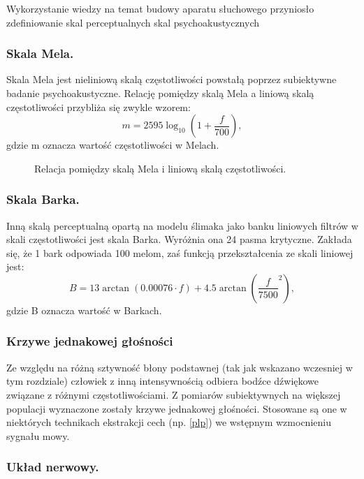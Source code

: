 Wykorzystanie wiedzy na temat budowy aparatu słuchowego przyniosło zdefiniowanie skal perceptualnych skal psychoakustycznych
\subsubsection{Skala Mela. \label{mel}}
Skala Mela jest nieliniową skalą częstotliwości powstałą poprzez subiektywne badanie psychoakustyczne. Relację pomiędzy skalą Mela a liniową skalą częstotliwości przybliża się zwykle wzorem:
\begin{equation}
  m = 2595\log_{10} \left( 1+ \frac{f}{700}\right),
\end{equation}
gdzie m oznacza wartość częstotliwości w Melach.

\begin{figure}[ht!]
  \centering
    
    \caption{\label{fig:mel} Relacja pomiędzy skalą Mela i liniową skalą częstotliwości.}
\end{figure}
\subsubsection{Skala Barka. \label{bark}}
Inną skalą perceptualną opartą na modelu ślimaka jako banku liniowych filtrów w skali częstotliwości jest skala Barka. Wyróżnia ona 24 pasma krytyczne. Zakłada się, że 1 bark odpowiada 100 melom, zaś funkcją przekształcenia ze skali liniowej jest:
\begin{equation}
  B = 13 \arctan \left( 0.00076\cdot f \right)+4.5\arctan\left(\frac{f}{7500}^2\right),
\end{equation}
gdzie B oznacza wartość w Barkach.

\subsubsection{Krzywe jednakowej głośności }
Ze względu na różną sztywność błony podstawnej (tak jak wskazano wczesniej w tym rozdziale) człowiek z inną intensywnością odbiera bodźce dźwiękowe związane z różnymi częstotliwościami. Z pomiarów subiektywnych na większej populacji wyznaczone zostały krzywe jednakowej głośności. Stosowane są one w niektórych technikach ekstrakcji cech (np. \ref{plp}) we wstępnym wzmocnieniu sygnału mowy.

\subsubsection{Układ nerwowy.}

